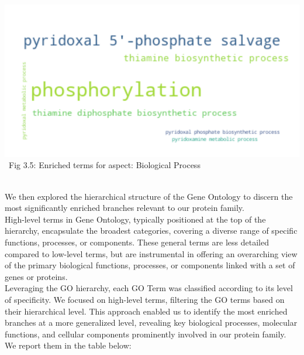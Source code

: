 \documentclass[10pt,twocolumn,letterpaper]{article}
\begin{document}
\begin{center}
    \includegraphics[scale=0.30]{report/img/word_cloud_bp.png} \\
    \
    \small{Fig 3.5: Enriched terms for aspect: Biological Process}
\end{center} \\

We then explored the hierarchical structure of the Gene Ontology to discern the most significantly enriched branches relevant to our protein family. \\

High-level terms in Gene Ontology, typically positioned at the top of the hierarchy, encapsulate the broadest categories, covering a diverse range of specific functions, processes, or components. These general terms are less detailed compared to low-level terms, but are instrumental in offering an overarching view of the primary biological functions, processes, or components linked with a set of genes or proteins. \\

Leveraging the GO hierarchy, each GO Term was classified according to its level of specificity. We focused on high-level terms, filtering the GO terms based on their hierarchical level. This approach enabled us to identify the most enriched branches at a more generalized level, revealing key biological processes, molecular functions, and cellular components prominently involved in our protein family. We report them in the table below:
\end{document}
